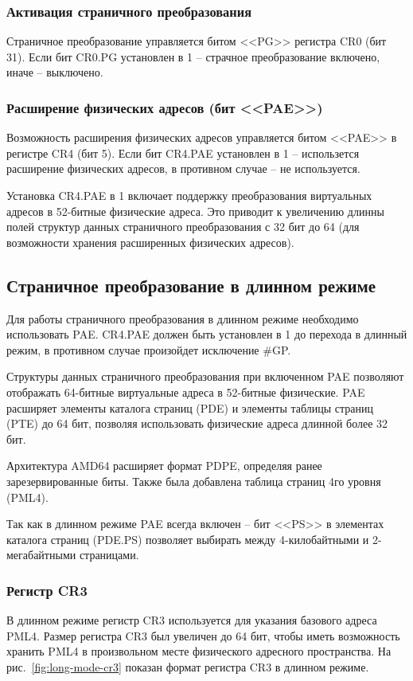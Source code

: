 \subsubsection*{Активация страничного преобразования}
Страничное преобразование управляется битом <<PG>> регистра CR0 (бит 31). Если бит CR0.PG установлен в 1 --
страчное преобразование включено, иначе -- выключено.

\subsubsection*{Расширение физических адресов (бит <<PAE>>)}
Возможность расширения физических адресов управляется битом <<PAE>> в регистре CR4 (бит 5). Если бит CR4.PAE
установлен в 1 -- использется расширение физических адресов, в противном случае -- не используется.

Установка CR4.PAE в 1 включает поддержку преобразования виртуальных адресов в 52-битные физические адреса.
Это приводит к увеличению длинны полей структур данных страничного преобразования с 32 бит до 64 (для
возможности хранения расширенных физических адресов).


\subsection{Страничное преобразование в длинном режиме}
Для работы страничного преобразования в длинном режиме необходимо использовать PAE.
CR4.PAE должен быть установлен в 1 до перехода в длинный режим, в противном случае
произойдет исключение \#GP.

Структуры данных страничного преобразования при включенном PAE позволяют отображать 64-битные
виртуальные адреса в 52-битные физические. PAE расширяет элементы каталога страниц (PDE) и
элементы таблицы страниц (PTE) до 64 бит, позволяя использовать физические адреса длинной более 32 бит.

Архитектура AMD64 расширяет формат PDPE, определяя ранее зарезервированные биты.
Также была добавлена таблица страниц 4го уровня (PML4).

Так как в длинном режиме PAE всегда включен -- бит <<PS>> в элементах каталога страниц (PDE.PS)
позволяет выбирать между 4-килобайтными и 2-мегабайтными страницами.

\subsubsection*{Регистр CR3}
В длинном режиме регистр CR3 используется для указания базового адреса PML4. Размер регистра CR3 был
увеличен до 64 бит, чтобы иметь возможность хранить PML4 в произвольном месте физического
адресного пространства. На рис.~\ref{fig:long-mode-cr3} показан формат регистра CR3 в длинном режиме.

